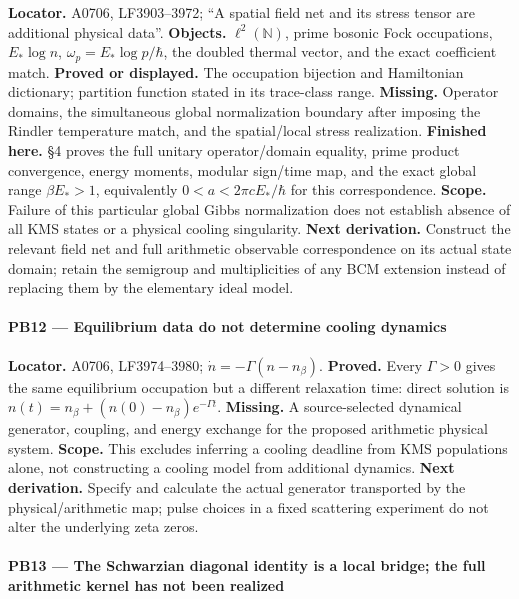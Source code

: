 \textbf{Locator.} A0706, LF3903--3972; ``A spatial field net and its
stress tensor are additional physical data''. \textbf{Objects.}
\(\ell^2(\mathbb N)\), prime bosonic Fock occupations, \(E_*\log n\),
\(\omega_p=E_*\log p/\hbar\), the doubled thermal vector, and the exact
coefficient match. \textbf{Proved or displayed.} The occupation
bijection and Hamiltonian dictionary; partition function stated in its
trace-class range. \textbf{Missing.} Operator domains, the simultaneous
global normalization boundary after imposing the Rindler temperature
match, and the spatial/local stress realization. \textbf{Finished here.}
\protect{} §4 proves the full unitary
operator/domain equality, prime product convergence, energy moments,
modular sign/time map, and the exact global range \(\beta E_*>1\),
equivalently \(0<a<2\pi cE_*/\hbar\) for this correspondence.
\textbf{Scope.} Failure of this particular global Gibbs normalization
does not establish absence of all KMS states or a physical cooling
singularity. \textbf{Next derivation.} Construct the relevant field net
and full arithmetic observable correspondence on its actual state
domain; retain the semigroup and multiplicities of any BCM extension
instead of replacing them by the elementary ideal model.

\paragraph{PB12 --- Equilibrium data do not determine cooling
dynamics}\label{TranscriptLedgerStage:pb12-equilibrium-data-do-not-determine-cooling-dynamics}

\textbf{Locator.} A0706, LF3974--3980; \(\dot n=-\Gamma(n-n_\beta)\).
\textbf{Proved.} Every \(\Gamma>0\) gives the same equilibrium
occupation but a different relaxation time: direct solution is
\(n(t)=n_\beta+(n(0)-n_\beta)e^{-\Gamma t}\). \textbf{Missing.} A
source-selected dynamical generator, coupling, and energy exchange for
the proposed arithmetic physical system. \textbf{Scope.} This excludes
inferring a cooling deadline from KMS populations alone, not
constructing a cooling model from additional dynamics. \textbf{Next
derivation.} Specify and calculate the actual generator transported by
the physical/arithmetic map; pulse choices in a fixed scattering
experiment do not alter the underlying zeta zeros.

\paragraph{PB13 --- The Schwarzian diagonal identity is a local bridge;
the full arithmetic kernel has not been
realized}\label{TranscriptLedgerStage:pb13-the-schwarzian-diagonal-identity-is-a-local-bridge-the-full-arithmetic-kernel-has-not-been-realized}

